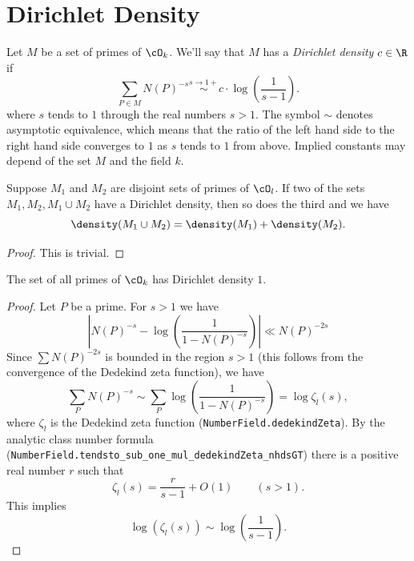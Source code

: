 \section{Dirichlet Density}

\begin{definition} \label{def:Dirichlet density}
	Let $M$ be a set of primes of $\cO_k$.
	We'll say that $M$ has a \emph{Dirichlet density} $c \in \R$ if
	\[
		\sum_{P \in M} N(P)^{-s} \stackrel{s \to 1+}\sim c  \cdot \log\left(\frac{1}{s-1}\right).
	\]
	where $s$ tends to $1$ through the real numbers $s>1$.
	The symbol $\sim$ denotes asymptotic equivalence, which means that the ratio of the left hand
	side to the right hand side converges to $1$ as $s$ tends to $1$ from above.
	Implied constants may depend of the set $M$ and the field $k$.
\end{definition}


\begin{lemma} \label{lem:Dirichlet density union}
	Suppose $M_1$ and $M_2$ are disjoint sets of primes of $\cO_l$.
	If two of the sets $M_1, M_2, M_1 \cup M_2$ have a Dirichlet density, then so does the third
	and we have
	\[
		\density(M_1 \cup M_2) = \density(M_1) + \density(M_2).
	\]
\end{lemma}

\begin{proof}
	This is trivial.
\end{proof}

\begin{lemma} \label{lem:Dirichlet density top}
	The set of all primes of $\cO_k$ has Dirichlet density $1$.
\end{lemma}

\begin{proof}
	Let $P$ be a prime. For $s > 1$ we have
	\[
		\left|N(P)^{-s} - \log\left( \frac{1}{1-N(P)^{-s}}\right)\right| \ll N(P)^{-2s}
	\]
	Since $\sum N(P)^{-2s}$ is bounded in the region $s > 1$ (this follows from the convergence of the
	Dedekind zeta function), we have
	\[
		\sum_P N(P)^{-s}
		\sim
		\sum_P \log\left( \frac{1}{1-N(P)^{-s}} \right)
		=
		\log \zeta_l(s),
	\]
	where $\zeta_l$ is the Dedekind zeta function (\texttt{NumberField.dedekindZeta}).
	By the analytic class number formula (\verb!NumberField.tendsto_sub_one_mul_dedekindZeta_nhdsGT!)
	there is a positive real number $r$ such that
	\[
		\zeta_l(s) = \frac{r}{s-1} + O(1) \qquad (s > 1).
	\]
	This implies
	\[
		\log(\zeta_l(s)) \sim \log\left( \frac{1}{s-1}\right).
	\]
\end{proof}



